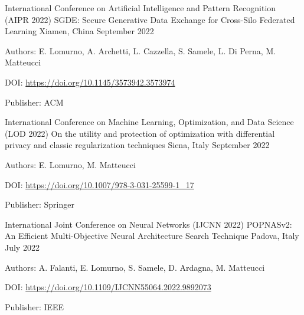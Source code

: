 \begin{cventries}
    \vspace{2mm}
    \cventry
        {International Conference on Artificial Intelligence and Pattern Recognition (AIPR 2022)}
        {SGDE: Secure Generative Data Exchange for Cross-Silo Federated Learning}
        {Xiamen, China}
        {September 2022}
        {
        \begin{cvitems}
            \item {Authors: E. Lomurno, A. Archetti, L. Cazzella, S. Samele, L. Di Perna, M. Matteucci}
            \item {DOI: \url{https://doi.org/10.1145/3573942.3573974}}
            \item {Publisher: ACM}
        \end{cvitems}
        }

    \vspace{2mm}
    \cventry
        {International Conference on Machine Learning, Optimization, and Data Science (LOD 2022)}
        {On the utility and protection of optimization with differential privacy and classic regularization techniques}
        {Siena, Italy}
        {September 2022}
        {
        \begin{cvitems}
            \item {Authors: E. Lomurno, M. Matteucci}
            \item {DOI: \url{https://doi.org/10.1007/978-3-031-25599-1_17}}
            \item {Publisher: Springer}
        \end{cvitems}
        }

    \vspace{2mm}
    \cventry
        {International Joint Conference on Neural Networks (IJCNN 2022)}
        {POPNASv2: An Efficient Multi-Objective Neural Architecture Search Technique}
        {Padova, Italy}
        {July 2022}
        {
        \begin{cvitems}
            \item {Authors: A. Falanti, E. Lomurno, S. Samele, D. Ardagna, M. Matteucci}
            \item {DOI: \url{https://doi.org/10.1109/IJCNN55064.2022.9892073}}
            \item {Publisher: IEEE}
        \end{cvitems}
        }


\end{cventries}
